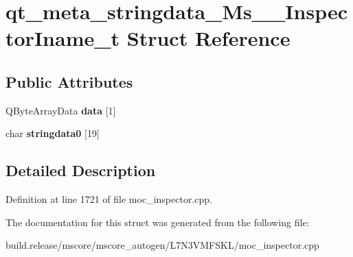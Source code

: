 \hypertarget{structqt__meta__stringdata___ms_____inspector_iname__t}{}\section{qt\+\_\+meta\+\_\+stringdata\+\_\+\+Ms\+\_\+\+\_\+\+Inspector\+Iname\+\_\+t Struct Reference}
\label{structqt__meta__stringdata___ms_____inspector_iname__t}
\subsection*{Public Attributes}
\begin{DoxyCompactItemize}
\item 
\mbox{\label{structqt__meta__stringdata___ms_____inspector_iname__t_a382f04d7f8d610f28fbabfe322726604}} 
Q\+Byte\+Array\+Data {\bfseries data} \mbox{[}1\mbox{]}
\item 
\mbox{\label{structqt__meta__stringdata___ms_____inspector_iname__t_a889ff0ff33a1de0b23237bec225d4a6c}} 
char {\bfseries stringdata0} \mbox{[}19\mbox{]}
\end{DoxyCompactItemize}


\subsection{Detailed Description}


Definition at line 1721 of file moc\+\_\+inspector.\+cpp.



The documentation for this struct was generated from the following file\+:\begin{DoxyCompactItemize}
\item 
build.\+release/mscore/mscore\+\_\+autogen/\+L7\+N3\+V\+M\+F\+S\+K\+L/moc\+\_\+inspector.\+cpp\end{DoxyCompactItemize}
